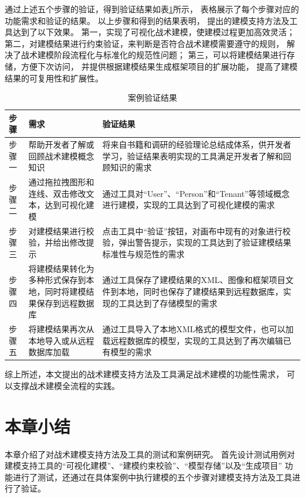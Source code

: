 通过上述五个步骤的验证，得到验证结果如表\ref{validationresult}所示，
表格展示了每个步骤对应的功能需求和验证的结果。
以上步骤和得到的结果表明，
提出的建模支持方法及工具达到了以下效果。
第一，实现了可视化战术建模，使建模过程更加高效灵活；
第二，对建模结果进行约束验证，来判断是否符合战术建模需要遵守的规则，
解决了战术建模阶段流程化与标准化的规范性问题；
第三，可以将建模结果进行存储，方便下次访问，
并提供根据建模结果生成框架项目的扩展功能，
提高了建模结果的可复用性和扩展性。

{\footnotesize
\begin{longtable}[h]{m{40pt}|m{95pt}|m{250pt}}
    \caption[案例验证结果]{案例验证结果} \label{validationresult} \\
        \hline  
        步骤&需求&验证结果\\
        \hline
        步骤一&帮助开发者了解或回顾战术建模概念知识&将来自书籍和调研的经验理论总结成体系，供开发者学习，验证结果表明实现的工具满足开发者了解和回顾知识的需求 \\
        \hline
        步骤二&通过拖拉拽图形和连线、双击修改文本，达到可视化建模&通过工具对“User”、“Person”和“Tenant”等领域概念进行建模，实现的工具达到了可视化建模的需求\\
        \hline
        步骤三&对建模结果进行校验，并给出修改提示&点击工具中“验证”按钮，对画布中现有的对象进行校验，弹出警告提示，实现的工具达到了验证建模结果标准性与规范性的需求 \\
        \hline
        步骤四&将建模结果转化为多种形式保存到本地，同时将建模结果保存到远程数据库&通过工具保存了建模结果的XML、图像和框架项目文件到本地，同时也保存了建模结果到远程数据库，实现的工具达到了存储模型的需求\\
        \hline
        步骤五&将建模结果再次从本地导入或从远程数据库加载&通过工具导入了本地XML格式的模型文件，也可以加载远程数据库的模型，实现的工具达到了再次编辑已有模型的需求\\
        \hline
\end{longtable} 
}

综上所述，本文提出的战术建模支持方法及工具满足战术建模的功能性需求，
可以支撑战术建模全流程的实践。




\section{本章小结}

本章介绍了对战术建模支持方法及工具的测试和案例研究。
首先设计测试用例对建模支持工具的“可视化建模”、“建模约束校验”、“模型存储”以及“生成项目”
功能进行了测试，还通过在具体案例中执行建模的五个步骤对建模支持方法及工具进行了验证。










